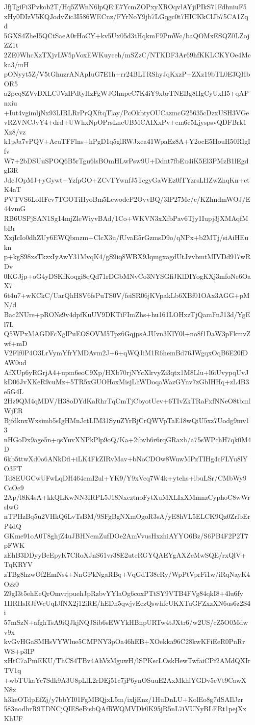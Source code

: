 JfjTgiFi3Pvkob2T/Hq5ZWnN6lpQEiE7YcmZOPxyXROqvlAYjiPIkS71FdhniuF5
xHy0DIzV5KQJodvZic3I586WECnz/FYrNoY9jb7LGqgc0t7HICKkClJb75CA1Zqd
5GXS4ZheI5QCtSaeA0rHoCY+kv5Ux05d3tHqkmF9PmWc/baQOMxESQZ0LZojZZ1t
2ZE0WhcXzTXjvLW5pVoxEWKuyceh/mSZzC/NTKDF3Ar69hfKKLCKYOe4Mcka3/mH
pONyyt5Z/V5tGhuzrANApIuG7E1h+rr24BLTRShyJqKxzP+ZXz19bTL0E3QHbOR5
a2pcq8ZVvDXLCJVzIPdtyHzFgWJGhnpeC7K4iY9xbrTNEBg8HgCyUxH5+qAPnxiu
+Iut4vgimljNx93LIRLRrPrQXftqTlay/PcOkbtyOUCazmcG25635cDzxUSH3VGe
vRZVNCJvY4+drd+UWhxNpOPrsLneUBMCAIXxPv+em6c5LjyspsvQDFBrk1Xz8/vz
k1pJa7vPQV+AcuTFFlns+hPgD1q5glRWJxea41WpaEz8A+Y2ocE5HouH50RIgIfv
W7+2bDSUuSPOQ6B5rTgu6lsBOmHLwPsw9U+Ddnt7fbEu4iK5El3PMzB1lEgdgI3R
JdeJOpMJ+yGywt+YzfpGO+ZCvTYwnfJ5TcgyGaWEz0fTYzrsLHZwZhqKn+ctK4aT
PVTVS6LoHFcv7TGOTiHyoBm5LcwodeP2OvvBQ/3IP27Mc/c/KZhndmWOJ/E44vmG
RB6USPjSAN1Sg14mjZleWiyvBAd/1Co+WKVN3xXfbPav6Tjy1Iupj3jXMAqfMbBr
XzjIcIo0dhZUy6EWQbmzm+ClcX3u/fUvaE5rGzmsD9o/qNPx+b2MTj/siAiHEukn
p+kgS98xsTkzxIyAwY31MvqK4/gS9iq8WBX9JqmgxagdUtJvvbmtMIVDd917wRDv
0KGJjp+oG4yDSKfKoqgi8qQd71rDGbMNvCo3NYSGfiJKlDIYogKXj3mfoNe6OaX7
6t4u7+wKCkC/UarQhH8V6fsPuTS0V/feiSR06jKVpakLb6XBf01OAx3AGG+pMN/d
Bac2NUre+pRONs9v4dpfKuUV9DKTiFImZhs+hu161LOHxzTjQamFnJ13d/YgEl7L
Q5WPxMAGDFcXglPuEOSOVM5Tpz6GqjpsAJUvn3KlY0l+no8f1DaW3pFkmvZwf+mD
V2Flf0P4O3LrVymYfrYMDAvm2J+6+qWQJiM1R6hemBd76JWgqxOqB6E20fDAW0ud
AfXUp6yRGrjA4+upm6eoC9Xp/HXb70rjNYcXlrvyZi3qtx1M8Llu+l6iUvypqUvJ
kD06JvXKeR9cuMz+5TR5xGUOHoxMisjLhWDoqaWazGYnv7zGbIHHq+zL4B3e5G4L
2Hz9QM4qMDV/H38oDYdKaRhrTqCmTjCbyotUev+6TIvZkTRaFxfNNeO8tbmlWjER
BjfdknxWxsimb5sIgHMnJctLIM31SyuZYrBjCrQWVpTaE18wQiU5xz7Uodg9mv13
nHGoDx9age5n+qsYuvXNPkPlp9oQ/Ka+2ibvb6r6rqGRaxh/a75sWPchH7qk0M4D
6kb5ttwXd0o6ANkDfi+iLK4FkZIRvMav+bNoCDOw8WuwMPzTIHg4cFLYu8lYO3FT
Td8EUGCwUFwLqDH464cmI2ul+YK9/Y9xVeq7W4k+ytehs+lbuLSr/CMbWy9CcOe9
2Ap/l8K4sA+kkQLKwNN3IRPL5J18NxeztnoFytXuMXLIxXMmnzCyphoC8wWrslwG
nTPHzBq5u2VHkQ6LvTsBM/9SFgBgNXmOgoR3sA/yE8hVL5ELCK9Qz0ZrlbErP4dQ
GKme91oA0T8ghjZ4uJBHNemZufDOe2AmVvusHxzhiAYYO6Bz/S6PB4F2P2T7pFWK
zEhB3DDyyBeEpyK7CRoXJnS61vr38E2uteRGYQAEYgAXZeMwSQE/rxQlV+TqKRYV
zTBg8hzwOf2EmNs4+NnGPkNgaRBq+VqGdT38cRy/WpPtVprFi1w/iRqNayK4Ozz0
Z9gI3t5ehEeQrOmvrjpuehJpRzbvYYlaOg6coxPTtSY9VTB4FVg84qkI8+4lu6fy
1HRHsRJfWeUqIJfNX2j12iRE/hEDn5qwjvEezQswhfcUKXTuGFZxzXN6us6z2S4i
57mSzN+afghTsA9iQJkjNQJSib6sEWYkHBnpURTw4tJXtr6/w2US/cZ5O0Mdwv9x
kvGvHGaSMHsVYWlue5CMPNY3pOa46hEB+XOekka96C28kwKFiEeR0PnRrWS+p3IP
xHtC7aPmEKU/ThCS4TBv4AhVzMguwH/lSPKscLOskHewTwfaiCPf2AMdQXIrTV1q
+wbTUkaYc7Sdk9A3U8pLlL2rDEj51c7jP6ynOSuuE2AxMkhlYGDv5cVt9CawXN8x
h3keOTdpEfZj/y7bbYI01FgMBQjxL5m/ixljEnz/1HuDnLU+KolEo8g7dSAIlJzr
583nodbrR9TDNCjQIESeBisbQAfRWQMVDk0K95jR5nL7iVUNyBLERt1pejXxKhUF
